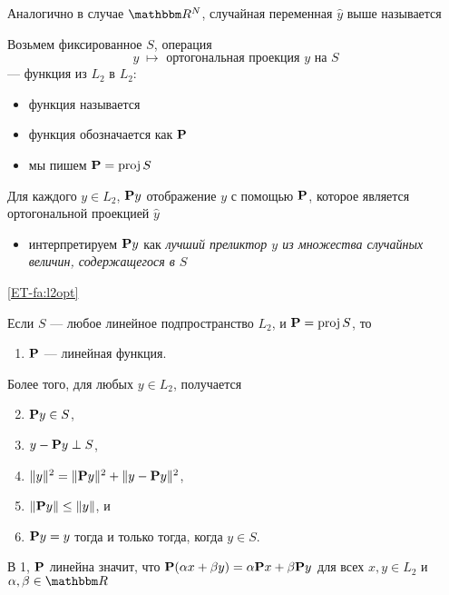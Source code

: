 \begin{frame}

    \vspace{2em}
    Аналогично в случае $\RR^N$, случайная переменная $\hat y$ выше 
    называется 
    
    Возьмем фиксированное $S$, операция
    \begin{equation*}
        y \; \mapsto \text{ ортогональная проекция $y$ на } S
    \end{equation*}
    --- функция из $L_2$ в $L_2$:

    \begin{itemize}
        \item функция называется 
        \item функция обозначается как $\mathbf P$ 
        \item мы пишем $\mathbf P = \operatorname{proj} S$
    \end{itemize}
    
\end{frame}

\begin{frame}
    
    \vspace{2em}
    Для каждого $y \in L_2$, $\mathbf P y$ отображение $y$ с помощью
    $\mathbf P$, которое является ортогональной проекцией $\hat y$
    \begin{itemize}
        \item интерпретируем $\mathbf P y$ как \emph{лучший преликтор $y$ из 
        множества случайных величин, содержащегося в $S$}
    \end{itemize}
    
\end{frame}

\begin{frame}

    \vspace{2em}
    \Fact\eqref{ET-fa:l2opt}

    Если $S$ --- любое линейное подпространство $L_2$, и $\mathbf P = \operatorname{proj} S$, то
    \begin{enumerate}
        \item $\mathbf P$ --- линейная функция.
    \end{enumerate}
    Более того, для любых $y \in L_2$, получается
    \begin{enumerate}
        \setcounter{enumi}{1}
        \item $\mathbf P y \in S$,
        \item $y - \mathbf P y \perp S$,
        \item $\| y \|^2 = \| \mathbf P y \|^2 + \| y - \mathbf P
            y \|^2$,
        \item $\| \mathbf P y \| \leq \| y \|$, и
        \item $\mathbf P y = y$ тогда и только тогда, когда $y \in S$.
    \end{enumerate}
    В 1, $\mathbf P$ линейна значит, что $\mathbf P(\alpha x + \beta y) =
    \alpha \mathbf P x + \beta \mathbf P y$ для всех $x, y \in L_2$  и $\alpha,\beta
    \in \RR$
    
\end{frame}

